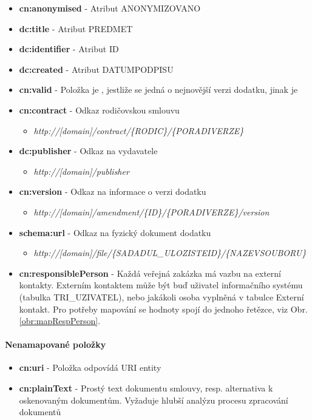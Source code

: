 \begin{itemize}
\item \textbf{cn:anonymised} - Atribut ANONYMIZOVANO
\item \textbf{dc:title} - Atribut PREDMET
\item \textbf{dc:identifier} - Atribut ID
\item \textbf{dc:created} - Atribut DATUMPODPISU
\item \textbf{cn:valid} - Položka je , jestliže se jedná o nejnovější verzi dodatku, jinak je 
\item \textbf{cn:contract} - Odkaz rodičovskou smlouvu
	\begin{itemize}
	\item \textit{http://[domain]/contract/\{RODIC\}/\{PORADIVERZE\}}
	\end{itemize}
\item \textbf{dc:publisher} - Odkaz na vydavatele
	\begin{itemize}
	\item \textit{http://[domain]/publisher}
	\end{itemize}
\item \textbf{cn:version} - Odkaz na informace o verzi dodatku
	\begin{itemize}
	\item \textit{http://[domain]/amendment/\{ID\}/\{PORADIVERZE\}/version}
	\end{itemize}
\item \textbf{schema:url} - Odkaz na fyzický dokument dodatku
	\begin{itemize}
	\item \textit{http://[domain]/file/\{SADADUL\_ULOZISTEID\}/\{NAZEVSOUBORU\}}
	\end{itemize}
\item \textbf{cn:responsiblePerson} - Každá veřejná zakázka má vazbu na externí kontakty. Externím kontaktem může být buď uživatel informačního systému (tabulka TRI\_UZIVATEL), nebo jakákoli osoba vyplněná v tabulce Externí kontakt. Pro potřeby mapování se hodnoty spojí do jednoho řetězce, viz Obr. \ref{obr:mapRespPerson}.
\end{itemize}

\paragraph*{Nenamapované položky}
\begin{itemize}
\item \textbf{cn:uri} - Položka odpovídá URI entity
\item \textbf{cn:plainText} - Prostý text dokumentu smlouvy, resp. alternativa k oskenovaným dokumentům. Vyžaduje hlubší analýzu procesu zpracování dokumentů 
\end{itemize}


